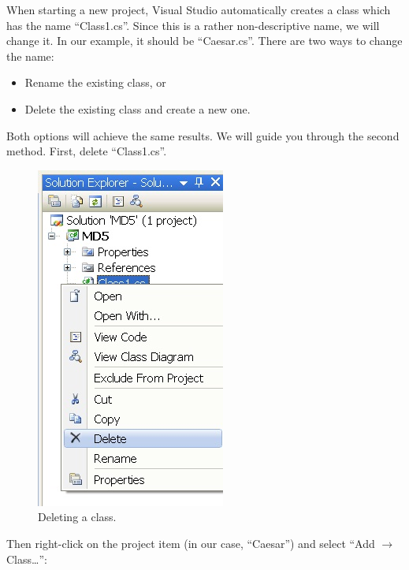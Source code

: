 When starting a new project, Visual Studio automatically creates a class which has the name ``Class1.cs''.  Since this is a rather non-descriptive name, we will change it. In our example, it should be ``Caesar.cs''. There are two ways to change the name:

\begin{itemize}
	\item Rename the existing class, or
	\item Delete the existing class and create a new one.
\end{itemize}

\noindent Both options will achieve the same results. We will guide you through the second method. First, delete ``Class1.cs''.

\begin{figure}[h!]
	\centering
		\includegraphics{figures/new_class.jpg}
	\caption{Deleting a class.}
	\label{fig:new_class}
\end{figure}
\clearpage

\noindent Then right-click on the project item (in our case, ``Caesar'') and select ``Add $\rightarrow$ Class\ldots '':

